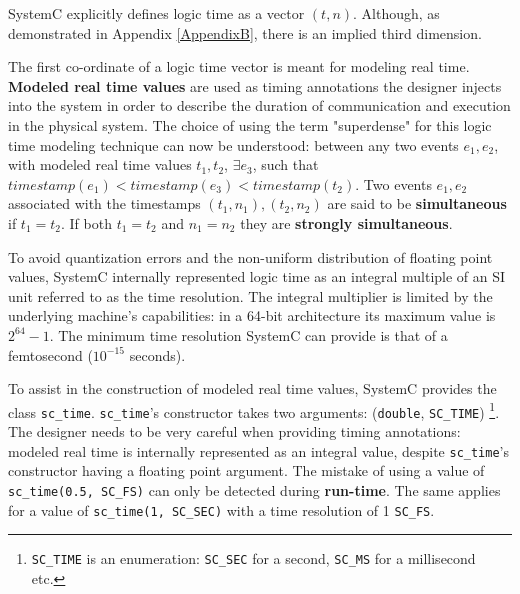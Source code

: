 \documentclass[11pt]{article}
\begin{document}
SystemC explicitly defines logic time as a vector \((t,n)\).
Although, as demonstrated in Appendix \ref{AppendixB}, there is an implied third dimension.

The first co-ordinate of a logic time vector is meant for modeling real time.
\textbf{Modeled real time values} are used as timing annotations the designer injects into the system in order to describe the duration of communication and execution in the physical system.
The choice of using the term "superdense" for this logic time modeling technique can now be understood: 
between any two events \(e_1, e_2\), with modeled real time values \(t_1, t_2\), \(\exists e_3\), such that \(timestamp(e_1) < timestamp(e_3) < timestamp(t_2)\).
Two events \(e_1, e_2\) associated with the timestamps \((t_1,n_1), (t_2, n_2)\) are said to be \textbf{simultaneous} if \(t_1 = t_2\).
If both \(t_1 = t_2\) and \(n_1 = n_2\) they are \textbf{strongly simultaneous}.

To avoid quantization errors and the non-uniform distribution of floating point values, SystemC internally represented logic time as an integral multiple of an SI unit referred to as the time resolution.
The integral multiplier is limited by the underlying machine's capabilities: in a 64-bit architecture its maximum value is \(2^{64}-1\).
The minimum time resolution SystemC can provide is that of a femtosecond (\(10^{-15}\) seconds).

To assist in the construction of modeled real time values, SystemC provides the class \texttt{sc\_time}.
\texttt{sc\_time}'s constructor takes two arguments: (\texttt{double}, \texttt{SC\_TIME}) \footnote{\texttt{SC\_TIME} is an enumeration: \texttt{SC\_SEC} for a second, \texttt{SC\_MS} for a millisecond etc.}.
The designer needs to be very careful when providing timing annotations: modeled real time is internally represented as an integral value, despite \texttt{sc\_time}'s constructor having a floating point argument.
The mistake of using a value of \texttt{sc\_time(0.5, SC\_FS)} can only be detected during \textbf{run-time}.
The same applies for a value of \texttt{sc\_time(1, SC\_SEC)} with a time resolution of 1 \texttt{SC\_FS}.
\end{document}
